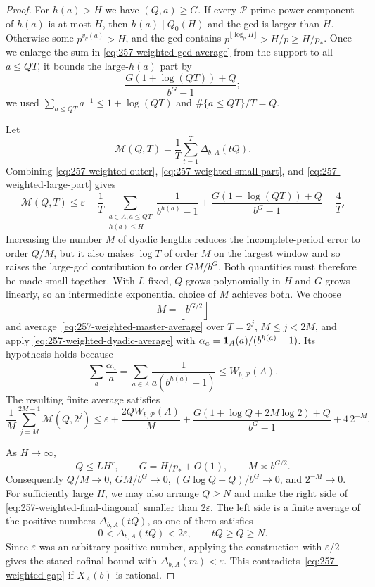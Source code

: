 \documentclass[11pt]{article}
\theoremstyle{plain}
\theoremstyle{definition}
\theoremstyle{remark}
\begin{document}
\begin{proof}
For $h(a)>H$ we have $(Q,a)\ge G$.  If every $\mathcal P$-prime-power
component of $h(a)$ is at most $H$, then $h(a)\mid Q_0(H)$ and the gcd is
larger than $H$.  Otherwise some $p^{v_p(a)}>H$, and the gcd contains
$p^{\lfloor\log_pH\rfloor}>H/p\ge H/p_*$. Once we enlarge the sum in
\eqref{eq:257-weighted-gcd-average} from the support to all $a\le QT$,
it bounds the large-$h(a)$ part by
\begin{equation}\label{eq:257-weighted-large-part}
 \frac{G(1+\log(QT))+Q}{b^G-1};
\end{equation}
we used $\sum_{a\le QT}a^{-1}\le1+\log(QT)$ and
$\#\{a\le QT\}/T=Q$.

Let
\[
 \mathcal M(Q,T)=\frac1T\sum_{t=1}^{T}\Delta_{b,A}(tQ).
\]
Combining \eqref{eq:257-weighted-outer},
\eqref{eq:257-weighted-small-part}, and
\eqref{eq:257-weighted-large-part} gives
\begin{equation}\label{eq:257-weighted-master-average}
 \mathcal M(Q,T)\le
 \varepsilon+
 \frac1T\sum_{\substack{a\in A, a\le QT\\h(a)\le H}}
       \frac1{b^{h(a)}-1}
 +\frac{G(1+\log(QT))+Q}{b^G-1}+\frac4T.
\end{equation}
Increasing the number $M$ of dyadic lengths reduces the incomplete-period
error to order $Q/M$, but it also makes $\log T$ of order $M$ on the
largest window and so raises the large-gcd contribution to order
$GM/b^G$. Both quantities must therefore be made small together. With $L$
fixed, $Q$ grows polynomially in $H$ and $G$ grows linearly, so an
intermediate exponential choice of $M$ achieves both. We choose
\[
 M=\left\lfloor b^{G/2}\right\rfloor
\]
and average~\eqref{eq:257-weighted-master-average} over
$T=2^j$, $M\le j<2M$, and apply
\eqref{eq:257-weighted-dyadic-average} with
$\alpha_a={\bf1}_A(a)/(b^{h(a)}-1)$.  Its hypothesis holds because
\[
 \sum_a\frac{\alpha_a}{a}
 =\sum_{a\in A}\frac1{a(b^{h(a)}-1)}
 \le W_{b,\mathcal P}(A).
\]
The resulting finite average satisfies
\begin{equation}\label{eq:257-weighted-final-diagonal}
 \frac1M\sum_{j=M}^{2M-1}\mathcal M(Q,2^j)
 \le \varepsilon+\frac{2QW_{b,\mathcal P}(A)}M
 +\frac{G(1+\log Q+2M\log2)+Q}{b^G-1}
 +4\,2^{-M}.
\end{equation}

As $H\to\infty$,
\[
 Q\le LH^r,\qquad G=H/p_*+O(1),\qquad M\asymp b^{G/2}.
\]
Consequently $Q/M\to0$, $GM/b^G\to0$,
$(G\log Q+Q)/b^G\to0$, and $2^{-M}\to0$.  For sufficiently large $H$,
we may also arrange $Q\ge N$ and make the right side of
\eqref{eq:257-weighted-final-diagonal} smaller than $2\varepsilon$.
The left side is a finite average of the positive numbers
$\Delta_{b,A}(tQ)$, so one of them satisfies
\[
 0<\Delta_{b,A}(tQ)<2\varepsilon,
 \qquad tQ\ge Q\ge N.
\]
Since $\varepsilon$ was an arbitrary positive number, applying the
construction with $\varepsilon/2$ gives the stated cofinal bound with
$\Delta_{b,A}(m)<\varepsilon$.
This contradicts~\eqref{eq:257-weighted-gap} if $X_A(b)$ is rational.
\end{proof}
\end{document}
